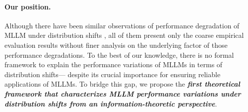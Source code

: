 \paragraph{Our position.} Although there have been similar observations of performance degradation of MLLM under distribution shifts \cite{achiam2023gpt, zhang2024out, zhou2024adapting, zhang2024vlmclf}, all of them present only the coarse empirical evaluation results without finer analysis on the underlying factor of those performance degradations. To the best of our knowledge, there is no formal framework to explain the performance variations of MLLMs in terms of distribution shifts--- despite its crucial importance for ensuring reliable applications of MLLMs. To bridge this gap, we propose the \textbf{\textit{{first theoretical framework that characterizes MLLM performance variations under distribution shifts from an information-theoretic perspective}}}.